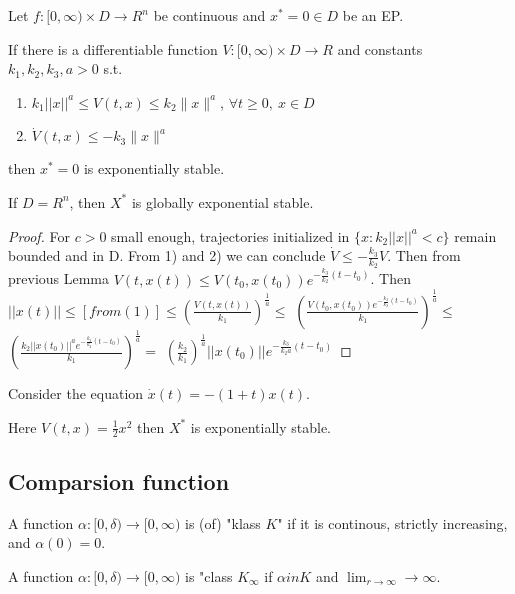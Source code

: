 \begin{Theorem}
 Let $f:[0, \infty)\times D \to R^n$ be continuous and $x^*=0 \in D$ be an EP.

 If there is a differentiable function $V:[0,\infty)\times D \to R$ and constants
 $k_1,k_2,k_3,a > 0$ s.t.
 \begin{enumerate}
  \item $k_1||x||^a \le V(t,x) \le k_2\|x\|^a$, $\forall t\ge 0, \ x\in D$
  \item $\dot V(t,x) \le -k_3\|x\|^a$
 \end{enumerate}

 then $x^*=0$ is exponentially stable.

 If $D=R^n$, then $X^*$ is globally exponential stable.

 \begin{proof}
 For $c>0$ small enough, trajectories initialized in $\{x:k_2||x||^a<c\}$
 remain bounded and in D. From 1) and 2) we can conclude 
 $\dot V \le -\frac{k_3}{k_2}V$. Then from previous Lemma 
 $V(t,x(t)) \le V(t_0,x(t_0))e^{-\frac{k_3}{k_2}(t-t_0)}$. Then
 $||x(t)|| \le [from (1)] \le \left( \frac{V(t,x(t))}{k_1}\right)^{\frac{1}{a}} \le$
 $\left(\frac{V(t_0,x(t_0))e^{-\frac{k_3}{k_2}(t-t_0)}}{k_1}\right)^{\frac{1}{a}} \le$ 
 $\left(\frac{k_2||x(t_0)||^a e^{-\frac{k_3}{k_2}(t-t_0)}}{k_1}\right)^{\frac{1}{a}} =$
 $\left( \frac{k_2}{k_1}\right)^{\frac{1}{a}} ||x(t_0)||e^{-\frac{k_3}{k_2a}(t-t_0)}$
 \end{proof}
\end{Theorem}

\begin{Example}
 Consider the equation $\dot x(t) = -(1+t)x(t)$.

 Here $V(t,x)=\frac{1}{2}x^2$ then $X^*$  is exponentially stable.
\end{Example}


\subsection{Comparsion function}

\begin{Definition}
 A function $\alpha:[0,\delta)\to [0, \infty)$ is (of) "klass $K$" if it is continous,
 strictly increasing, and $\alpha(0)=0$.
\end{Definition}

\begin{Definition}
 A function $\alpha:[0,\delta)\to [0, \infty)$ is "class $K_\infty$ if $\alpha in K$
 and $\lim_{r\to\infty} \to\infty$.
\end{Definition}


